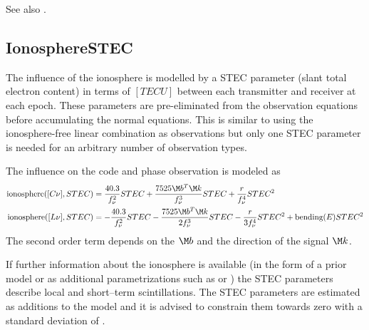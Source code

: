 See also .


\subsection{IonosphereSTEC}\label{gnssParametrizationType:ionosphereSTEC}
The influence of the ionosphere is modelled by a STEC parameter (slant total electron content)
in terms of $[TECU]$ between each transmitter and receiver at each epoch. These parameters are pre-eliminated
from the observation equations before accumulating the normal equations.
This is similar to using the ionosphere-free linear combination as observations
but only one STEC parameter is needed for an arbitrary number of observation types.

The influence on the code and phase observation is modeled as
\begin{equation}\label{gnssParametrizationType:IonosphereSTEC:STEC}
\begin{split}
\text{ionosphere}([C\nu], STEC) &=  \frac{40.3}{f_{\nu}^2}STEC + \frac{7525\M b^T\M k}{f_{\nu}^3}STEC +  \frac{r}{f_{\nu}^4}STEC^2 \\
\text{ionosphere}([L\nu], STEC) &= -\frac{40.3}{f_{\nu}^2}STEC - \frac{7525\M b^T\M k}{2f_{\nu}^3}STEC - \frac{r}{3f_{\nu}^4}STEC^2 + \text{bending}(E)STEC^2
\end{split}
\end{equation}
The second order term depends on the  $\M b$
and the direction of the signal $\M k$.

If further information about the ionosphere is available
(in the form of a prior model or as additional parametrizations
such as  or
) the STEC
parameters describe local and short–term scintillations. The STEC parameters are estimated
as additions to the model and it is advised to constrain them towards zero
with a standard deviation of .


